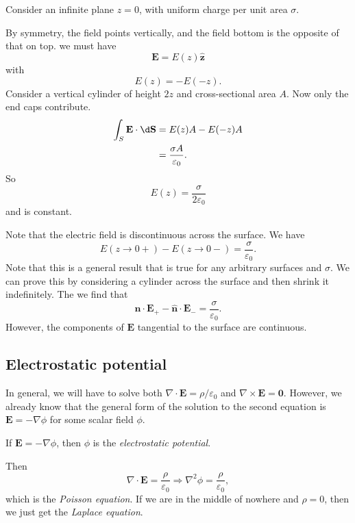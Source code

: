 \documentclass[a4paper]{article}
\begin{document}
\begin{eg}
  Consider an infinite plane $z = 0$, with uniform charge per unit area $\sigma$.

  \begin{center}
  \end{center}

  By symmetry, the field points vertically, and the field bottom is the opposite of that on top. we must have
  \[
    \mathbf{E} = E(z)\hat{\mathbf{z}}
  \]
  with
  \[
    E(z) = -E(-z).
  \]
  Consider a vertical cylinder of height $2z$ and cross-sectional area $A$. Now only the end caps contribute.
  \begin{align*}
    \int_S \mathbf{E} \cdot \d \mathbf{S} &= E(z) A - E(-z) A\\
    &=\frac{\sigma A}{\varepsilon _0}. 
  \end{align*}
  So
  \[
    E(z) = \frac{\sigma }{2\varepsilon_0}
  \]
  and is constant.

  Note that the electric field is discontinuous across the surface. We have
  \[
    E(z\to 0+) - E(z\to 0-) = \frac{\sigma}{\varepsilon_0}.
  \]
  Note that this is a general result that is true for any arbitrary surfaces and $\sigma$. We can prove this by considering a cylinder across the surface and then shrink it indefinitely. The we find that
  \[
    \hat{\mathbf{n}}\cdot \mathbf{E}_+ - \hat{\mathbf{n}}\cdot \mathbf{E}_- = \frac{\sigma}{\varepsilon_0}.
  \]
  However, the components of $\mathbf{E}$ tangential to the surface are continuous. 
\end{eg}

\subsection{Electrostatic potential}
In general, we will have to solve both $\nabla \cdot \mathbf{E} = \rho/\varepsilon_0$ and $\nabla \times \mathbf{E} = \mathbf{0}$. However, we already know that the general form of the solution to the second equation is $\mathbf{E} = -\nabla\phi$ for some scalar field $\phi$.
\begin{defi}
  If $\mathbf{E} = -\nabla \phi$, then $\phi$ is the \emph{electrostatic potential}.
\end{defi}
Then
\[
  \nabla\cdot \mathbf{E} = \frac{\rho}{\varepsilon_0} \Rightarrow \nabla^2\phi = \frac{\rho}{\varepsilon_0},
\]
which is the \emph{Poisson equation}. If we are in the middle of nowhere and $\rho = 0$, then we just get the \emph{Laplace equation}.
\end{document}
